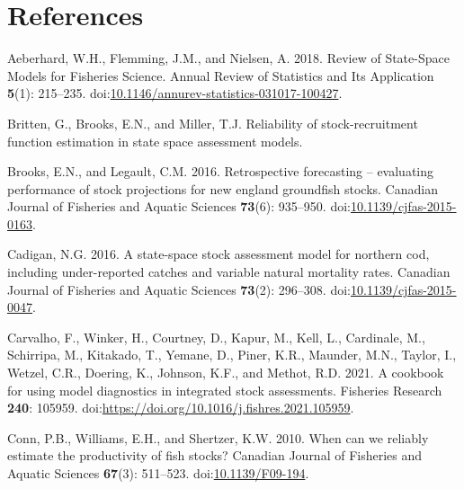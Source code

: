 \documentclass[
  12pt,
]{article}
\newlength{\cslhangindent}
\newlength{\cslentryspacingunit} %
\newenvironment{CSLReferences}[2] %
 {%
  \setlength{\parindent}{0pt}
  \ifodd #1
  \let\oldpar\par
  \def\par{\hangindent=\cslhangindent\oldpar}
  \fi
  \setlength{\parskip}{#2\cslentryspacingunit}
 }%
 {}
\begin{document}
\pagebreak

\hypertarget{references}{%
\section*{References}\label{references}}

\hypertarget{refs}{}
\begin{CSLReferences}{1}{0}
\leavevmode{}%
Aeberhard, W.H., Flemming, J.M., and Nielsen, A. 2018. Review of
{State}-{Space Models} for {Fisheries Science}. Annual Review of
Statistics and Its Application \textbf{5}(1): 215--235.
doi:\href{https://doi.org/10.1146/annurev-statistics-031017-100427}{10.1146/annurev-statistics-031017-100427}.

\leavevmode{}%
Britten, G., Brooks, E.N., and Miller, T.J. Reliability of
stock-recruitment function estimation in state space assessment models.

\leavevmode{}%
Brooks, E.N., and Legault, C.M. 2016. Retrospective forecasting --
evaluating performance of stock projections for new england groundfish
stocks. Canadian Journal of Fisheries and Aquatic Sciences
\textbf{73}(6): 935--950.
doi:\href{https://doi.org/10.1139/cjfas-2015-0163}{10.1139/cjfas-2015-0163}.

\leavevmode{}%
Cadigan, N.G. 2016. A state-space stock assessment model for northern
cod, including under-reported catches and variable natural mortality
rates. Canadian Journal of Fisheries and Aquatic Sciences
\textbf{73}(2): 296--308.
doi:\href{https://doi.org/10.1139/cjfas-2015-0047}{10.1139/cjfas-2015-0047}.

\leavevmode{}%
Carvalho, F., Winker, H., Courtney, D., Kapur, M., Kell, L., Cardinale,
M., Schirripa, M., Kitakado, T., Yemane, D., Piner, K.R., Maunder, M.N.,
Taylor, I., Wetzel, C.R., Doering, K., Johnson, K.F., and Methot, R.D.
2021. A cookbook for using model diagnostics in integrated stock
assessments. Fisheries Research \textbf{240}: 105959.
doi:\url{https://doi.org/10.1016/j.fishres.2021.105959}.

\leavevmode{}%
Conn, P.B., Williams, E.H., and Shertzer, K.W. 2010. When can we
reliably estimate the productivity of fish stocks? Canadian Journal of
Fisheries and Aquatic Sciences \textbf{67}(3): 511--523.
doi:\href{https://doi.org/10.1139/F09-194}{10.1139/F09-194}.


\end{CSLReferences}
\end{document}
